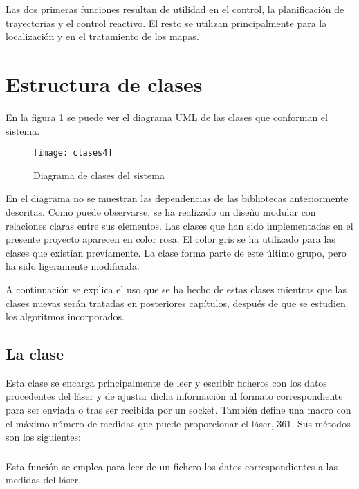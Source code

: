 Las dos primeras funciones resultan de utilidad en el control, la planificación de trayectorias y el control reactivo. El resto se utilizan principalmente para la localización y en el tratamiento de los mapas.

\section{ Estructura de clases}
En la figura \ref{fg:uml} se puede ver el diagrama UML de las clases que conforman el sistema.

\begin{figure}[h]
  \centering\texttt{[image: clases4]}\\
  \caption{Diagrama de clases del sistema}\label{fg:uml}
\end{figure}

\clearpage
En el diagrama no se muestran las dependencias de las bibliotecas anteriormente descritas. Como puede observarse, se ha realizado un diseño modular con relaciones claras entre sus elementos. Las clases que han sido implementadas en el presente proyecto aparecen en color rosa. El color gris se ha utilizado para las clases que existían previamente. La clase  forma parte de este último grupo, pero ha sido ligeramente modificada.

A continuación se explica el uso que se ha hecho de estas clases mientras que las clases nuevas serán tratadas en posteriores capítulos, después de que se estudien los algoritmos incorporados.

\subsection{La clase }
Esta clase se encarga principalmente de leer y escribir ficheros con los datos procedentes del láser y de ajustar dicha información al formato correspondiente para ser enviada o tras ser recibida por un socket. También define una macro con el máximo número de medidas que puede proporcionar el láser, 361.
Sus métodos son los siguientes:

\subsubsection{}

\noindent
{}

\noindent
Esta función se emplea para leer de un fichero los datos correspondientes a las medidas del láser.

